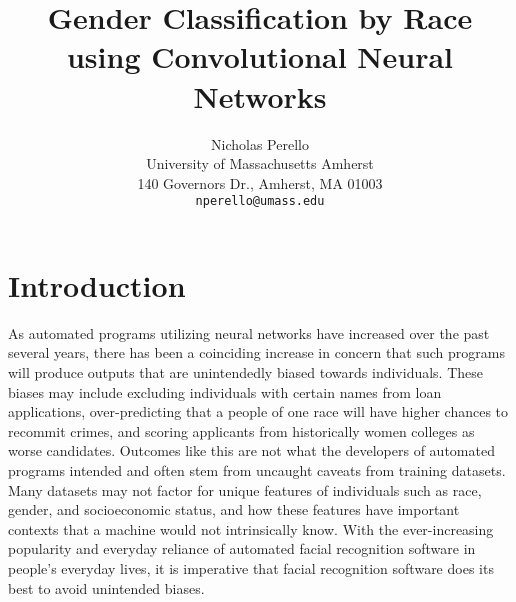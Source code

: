 \documentclass[10pt,twocolumn,letterpaper]{article}
\begin{document}
\title{Gender Classification by Race using Convolutional Neural Networks}

\author{Nicholas Perello\\
University of Massachusetts Amherst\\
140 Governors Dr., Amherst, MA 01003\\
{\tt\small nperello@umass.edu}
}

\maketitle



\section{Introduction}

As automated programs utilizing neural networks have increased over the past several years, there has been a coinciding increase in concern that such programs will produce outputs that are unintendedly biased towards individuals. These biases may include excluding individuals with certain names from loan applications, over-predicting that a people of one race will have higher chances to recommit crimes, and scoring applicants from historically women colleges as worse candidates. Outcomes like this are not what the developers of automated programs intended and often stem from uncaught caveats from training datasets. Many datasets may not factor for unique features of individuals such as race, gender, and socioeconomic status, and how these features have important contexts that a machine would not intrinsically know. With the ever-increasing popularity and everyday reliance of automated facial recognition software in people’s everyday lives, it is imperative that facial recognition software does its best to avoid unintended biases.
\end{document}

